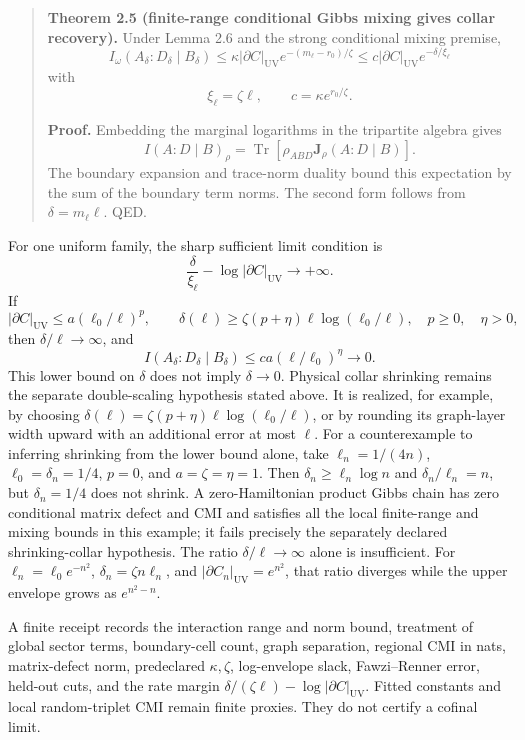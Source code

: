 \begin{quote}
\textbf{Theorem 2.5 (finite-range conditional Gibbs mixing gives collar recovery).}
Under Lemma 2.6 and the strong conditional mixing premise,
\[
\boxed{
I_\omega(A_\delta:D_\delta\mid B_\delta)
\le
\kappa|\partial C|_{\mathrm{UV}}e^{-(m_\ell-r_0)/\zeta}
\le
c|\partial C|_{\mathrm{UV}}e^{-\delta/\xi_\ell}}
\]
with
\[
\xi_\ell=\zeta\ell,
\qquad
c=\kappa e^{r_0/\zeta}.
\]

\textbf{Proof.} Embedding the marginal logarithms in the tripartite algebra gives
\[
I(A:D\mid B)_\rho
=\operatorname{Tr}\!\left[\rho_{ABD}\mathbf J_\rho(A:D\mid B)\right].
\]
The boundary expansion and trace-norm duality bound this expectation by the sum of the boundary
term norms. The second form follows from \(\delta=m_\ell\ell\). QED.
\end{quote}

For one uniform family, the sharp sufficient limit condition is
\[
\frac{\delta}{\xi_\ell}-\log|\partial C|_{\mathrm{UV}}\longrightarrow+\infty.
\]
If
\[
|\partial C|_{\mathrm{UV}}\le a(\ell_0/\ell)^p,
\qquad
\delta(\ell)\ge\zeta(p+\eta)\ell\log(\ell_0/\ell),
\quad p\ge0,\quad \eta>0,
\]
then \(\delta/\ell\to\infty\), and
\[
I(A_\delta:D_\delta\mid B_\delta)
\le ca(\ell/\ell_0)^\eta\longrightarrow0.
\]
This lower bound on \(\delta\) does not imply \(\delta\to0\).
Physical collar shrinking remains the separate double-scaling hypothesis
stated above. It is realized, for example, by choosing
\(\delta(\ell)=\zeta(p+\eta)\ell\log(\ell_0/\ell)\), or by rounding
its graph-layer width upward with an additional error at most \(\ell\).
For a counterexample to inferring shrinking from the lower bound alone,
take \(\ell_n=1/(4n)\), \(\ell_0=\delta_n=1/4\),
\(p=0\), and \(a=\zeta=\eta=1\). Then
\(\delta_n\ge\ell_n\log n\) and \(\delta_n/\ell_n=n\), but
\(\delta_n=1/4\) does not shrink. A zero-Hamiltonian product Gibbs chain
has zero conditional matrix defect and CMI and satisfies all the local
finite-range and mixing bounds in this example; it fails precisely the
separately declared shrinking-collar hypothesis.
The ratio \(\delta/\ell\to\infty\) alone is insufficient. For
\(\ell_n=\ell_0e^{-n^2}\), \(\delta_n=\zeta n\ell_n\), and
\(|\partial C_n|_{\mathrm{UV}}=e^{n^2}\), that ratio diverges while the upper envelope grows as
\(e^{n^2-n}\).

A finite receipt records the interaction range and norm bound, treatment of global sector terms,
boundary-cell count, graph separation, regional CMI in nats, matrix-defect norm, predeclared
\(\kappa,\zeta\), log-envelope slack, Fawzi--Renner error, held-out cuts, and the rate margin
\(\delta/(\zeta\ell)-\log|\partial C|_{\mathrm{UV}}\). Fitted constants and local random-triplet
CMI remain finite proxies. They do not certify a cofinal limit.

